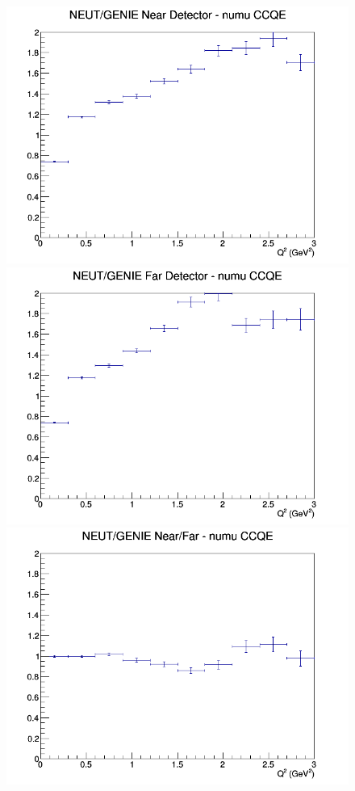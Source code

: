 \documentclass[12pt]{article}
\begin{document}
\begin{figure}[h]
\endminipage
\newline
{}
\includegraphics[width=\linewidth]{eff_Q2/LAr/ratios/CCQE_NEUT_GENIE_numu_near_Q2.png}
\endminipage
{}
\includegraphics[width=\linewidth]{eff_Q2/LAr/ratios/CCQE_NEUT_GENIE_numu_far_Q2.png}
\endminipage
{}
\includegraphics[width=\linewidth]{eff_Q2/LAr/ratios/CCQE_NEUT_GENIE_numu_NF_Q2.png}

\end{figure}
\end{document}
